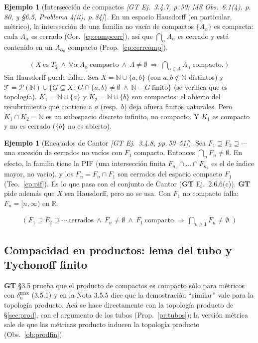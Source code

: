 \documentclass[11pt,a4paper]{article}
\newcommand{\lgc}[1]{\par\vspace{-3pt}\begin{gather*}\big(\;#1\;\big)\end{gather*}\vspace{-6pt}}
\theoremstyle{definition}
\newtheorem{ejemplo}[definicion]{Ejemplo}
\theoremstyle{plain}
\newcommand{\fnt}[1]{{\normalfont\small\itshape\color{gray!150!black}[#1]}}
\newcommand{\R}{\mathbb{R}}
\newcommand{\N}{\mathbb{N}}
\newcommand{\tp}{\mathcal{T}}
\begin{document}
\begin{ejemplo}[Intersección de compactos \fnt{GT Ej.\ 3.4.7, p.\,50; MS Obs.\ 6.1(4), p.\,80, y \S6.5, Problema 4(ii), p.\,84}]\label{cp:intercomp}
En un espacio Hausdorff (en particular, métrico), la intersección de una familia no vacía de compactos $\{A_\alpha\}$ es compacta: cada $A_\alpha$ es cerrado (Cor.~\ref{cp:compcerr}), así que $\bigcap_\alpha A_\alpha$ es cerrado y está contenido en un $A_{\alpha_0}$ compacto (Prop.~\ref{cp:cerrcomp}).
\lgc{X\ \text{es }T_2\ \wedge\ \forall\alpha\ A_\alpha\ \text{compacto}\ \wedge\ \Lambda\ne\emptyset\ \Rightarrow\ \textstyle\bigcap_{\alpha\in\Lambda}A_\alpha\ \text{compacto}.}
Sin Hausdorff puede fallar. Sea $X=\N\cup\{a,b\}$ (con $a,b\notin\N$ distintos) y $\tp=\mathcal P(\N)\cup\{G\subseteq X:\ G\cap\{a,b\}\ne\emptyset\ \wedge\ \N-G\ \text{finito}\}$ (se verifica que es topología). $K_1=\N\cup\{a\}$ y $K_2=\N\cup\{b\}$ son compactos: el abierto del recubrimiento que contiene a $a$ (resp.\ $b$) deja afuera finitos naturales. Pero $K_1\cap K_2=\N$ es un subespacio discreto infinito, no compacto. Y $K_1$ es compacto y no es cerrado ($\{b\}$ no es abierto).
\end{ejemplo}

\begin{ejemplo}[Encajados de Cantor \fnt{GT Ej.\ 3.4.8, pp.\,50--51}]\label{cp:cantor}
Sea $F_1\supseteq F_2\supseteq\cdots$ una sucesión de cerrados no vacíos con $F_1$ compacto. Entonces $\bigcap_{n}F_n\ne\emptyset$. En efecto, la familia tiene la PIF (una intersección finita $F_{n_1}\cap\dots\cap F_{n_k}$ es el de índice mayor, no vacío), y los $F_n=F_n\cap F_1$ son cerrados del espacio compacto $F_1$ (Teo.~\ref{cp:pif}). Es lo que pasa con el conjunto de Cantor (\textbf{GT} Ej.\ 2.6.6(c)). \textbf{GT} pide además que $X$ sea Hausdorff, pero no se usa. Con $F_1$ no compacto falla: $F_n=[n,\infty)$ en $\R$.
\lgc{F_1\supseteq F_2\supseteq\cdots\ \text{cerrados}\ \wedge\ F_n\ne\emptyset\ \wedge\ F_1\ \text{compacto}\ \Rightarrow\ \textstyle\bigcap_{n\ge1}F_n\ne\emptyset.}
\end{ejemplo}

\subsection[Compacidad en productos]{Compacidad en productos: lema del tubo y Tychonoff finito}\label{cp:sub-prod}

\noindent \textbf{GT} \S3.5 prueba que el producto de compactos es compacto sólo para métricos con $\delta^{\max}_n$ (3.5.1) y en la Nota 3.5.5 dice que la demostración ``similar'' vale para la topología producto. Acá se hace directamente con la topología producto de \S\ref{sec:prod}, con el argumento de los tubos (Prop.~\ref{pr:tubos}); la versión métrica sale de que las métricas producto inducen la topología producto (Obs.~\ref{ob:prodfin}).
\end{document}
